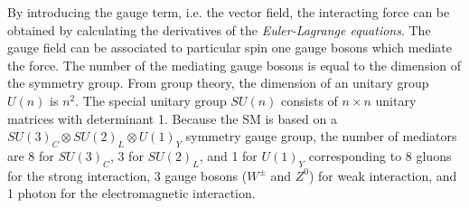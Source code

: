%
By introducing the gauge term, i.e. the vector field, the interacting force can be obtained by calculating the derivatives of the \textit{Euler-Lagrange equations}.
The gauge field can be associated to particular spin one gauge bosons which mediate the force.
The number of the mediating gauge bosons is equal to the dimension of the symmetry group.
From group theory, the dimension of an unitary group $U(n)$ is $n^{2}$.
The special unitary group $SU(n)$ consists of $n \times n$ unitary matrices with determinant 1.
Because the SM is based on a $SU(3)_{C} \otimes SU(2)_{L} \otimes U(1)_{Y}$ symmetry gauge group, the number of mediators are 8 for $SU(3)_{C}$, 3 for $SU(2)_{L}$, and 1 for $U(1)_{Y}$ corresponding to 8 gluons for the strong interaction, 3 gauge bosons ($W^{\pm}$ and $Z^{0}$) for weak interaction, and 1 photon for the electromagnetic interaction.


